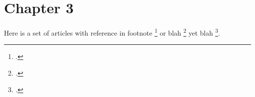 \chapter{Chapter 3}
\label{chap:chapter-3}

Here is a set of articles with reference in footnote \footcite{clarke1990rendezvous} or blah \footcite{Kandasamy2010a, Slenter2018} yet blah \footcite{Garimalla2019a, Ackerman2018a}. 